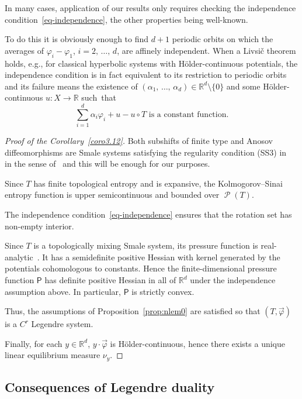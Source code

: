 \documentclass[AHL, Unicode, longabstracts,published]{cedram}
\theoremstyle{plain}
\theoremstyle{plain}
\newcommand\vpot{\vec\pot}
\newcommand\Prob{{\operatorname{\mathscr{P}}}}
\newcommand{\Pf}{\mathsf{P}}
\newcommand{\pot}{\varphi}
\newcounter{In}
\newcommand*\8{\infty}
\newcommand\RR{\mathbb{R}}
\begin{document}
\begin{rema}\label{rem-livsic}
In many cases, application of our results only requires checking the independence condition~\eqref{eq-independence}, the other properties being well-known.

To do this it is obviously enough to find $d+1$ periodic orbits on which the averages of $\pot_i-\pot_1$, $i=2,\,\dots,\,d$, are affinely independent. When a Livsič theorem holds, e.g., for classical hyperbolic systems with H\"older-continuous potentials, the independence condition is in fact equivalent to its restriction to periodic orbits and its failure means the existence of $(\alpha_1,\,\dots,\,\alpha_d)\in\RR^d\setminus\{0\}$ and some H\"older-continuous $u:X\to\RR$ such~that
\[
\sum_{i=1}^d \alpha_i\pot_i + u-u\circ T \text{ is a constant function}.
\]
\end{rema}


\begin{proof}[Proof of the Corollary~\ref{coro3.12}]
Both subshifts of finite type and Anosov diffeomorphisms are Smale systems satisfying the regularity condition (SS3) in~\cite{Ruelle-book} in the sense of~\cite[7.1, 7.11]{Ruelle-book} and this will be enough for our purposes.

Since $T$ has finite topological entropy and is expansive, the Kolmogorov--Sinai entropy function is upper semicontinuous and bounded over $\Prob(T)$.

The independence condition~\eqref{eq-independence} ensures that the rotation set has non-empty interior.

Since $T$ is a topologically mixing Smale system, its pressure function is real-analytic~\cite[7.10]{Ruelle-book}. It has a semidefinite positive Hessian with kernel generated by the potentials cohomologous to constants. Hence the finite-dimensional pressure function $\Pf$ has definite positive Hessian in all of $\RR^d$ under the independence assumption above. In particular, $\Pf$ is strictly convex.

Thus, the assumptions of Proposition~\ref{prop:nlem0} are satisfied so that $(T,\vpot)$ is a $C^r$ Legendre system.

Finally, for each $ y\in\RR^d$, $ y\cdot\vpot$ is H\"older-continuous, hence there exists a unique linear equilibrium measure $\nu_{ y}$.
\end{proof}



\subsection{Consequences of Legendre duality}
\end{document}
